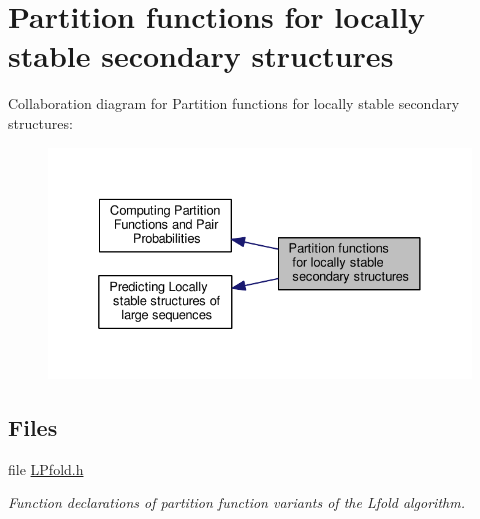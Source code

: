 \hypertarget{group__local__pf__fold}{\section{Partition functions for locally stable secondary structures}
\label{group__local__pf__fold}
}
Collaboration diagram for Partition functions for locally stable secondary structures\-:
\nopagebreak
\begin{figure}[H]
\begin{center}
\leavevmode
\includegraphics[width=332pt]{group__local__pf__fold}
\end{center}
\end{figure}
\subsection*{Files}
\begin{DoxyCompactItemize}
\item 
file \hyperlink{LPfold_8h}{L\-Pfold.\-h}
\begin{DoxyCompactList}\small\item\em Function declarations of partition function variants of the Lfold algorithm. \end{DoxyCompactList}\end{DoxyCompactItemize}
